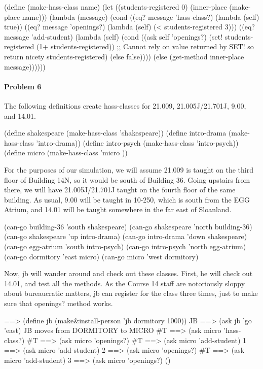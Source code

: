 \beginlisp
(define (make-hass-class name)
  (let ((students-registered 0)
        (inner-place (make-place name)))
    (lambda (message)
      (cond ((eq? message 'hass-class?) (lambda (self) true))
            ((eq? message 'openings?) 
             (lambda (self) (< students-registered 3)))
            ((eq? message 'add-student)
             (lambda (self)
               (cond ((ask self 'openings?)
                      (set! students-registered (1+ students-registered))
                      ;; Cannot rely on value returned by SET! so return nicety
                      students-registered)
                     (else false))))
            (else (get-method inner-place message))))))
\endlisp

\paragraph{Problem 6}

The following definitions create {\cf hass-class}es for 21.009,
21.005J/21.701J, 9.00, and 14.01.  

\beginlisp
(define shakespeare (make-hass-class 'shakespeare))
(define intro-drama (make-hass-class 'intro-drama))
(define intro-psych (make-hass-class 'intro-psych))
(define micro       (make-hass-class 'micro      ))
\endlisp

For the purposes of our simulation, we will assume 21.009 is taught on
the third floor of Building 14N, so it would be south of Building 36.
Going upstairs from there, we will have 21.005J/21.701J taught on the fourth
floor of the same building.  As usual, 9.00 will be taught in 10-250,
which is south from the EGG Atrium, and 14.01 will be taught somewhere
in the far east of Sloanland.  

\beginlisp
(can-go building-36 'south shakespeare)
(can-go shakespeare 'north building-36)
(can-go shakespeare 'up    intro-drama)
(can-go intro-drama 'down  shakespeare)
(can-go egg-atrium  'south intro-psych)
(can-go intro-psych 'north egg-atrium)
(can-go dormitory   'east  micro)
(can-go micro       'west  dormitory)
\endlisp

\newpage

Now, {\cf jb} will wander around and check out these classes.  First,
he will check out 14.01, and test all the methods.  As the Course 14
staff are notoriously sloppy about bureaucratic matters, {\cf jb} can
register for the class three times, just to make sure that {\cf
openings?} method works.

\beginlisp
==> (define jb (make\&install-person 'jb dormitory 1000))
JB
\null
==> (ask jb 'go 'east)
JB moves from DORMITORY to MICRO 
\#T
\null
==> (ask micro 'hass-class?)
\#T
\null
==> (ask micro 'openings?)
\#T
\null
==> (ask micro 'add-student)
1
\null
==> (ask micro 'add-student)
2
\null
==> (ask micro 'openings?)
\#T
\null
==> (ask micro 'add-student)
3
\null
==> (ask micro 'openings?)
()
\endlisp

